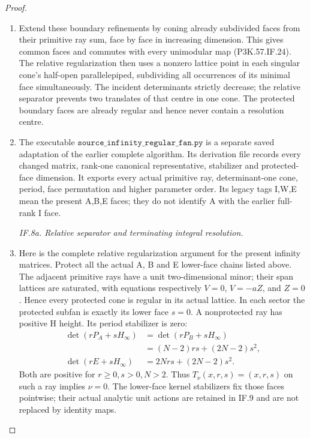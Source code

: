 \begin{proof}
\begin{enumerate}[label=\arabic*.]
\item Extend these boundary refinements by coning already subdivided
faces from their primitive ray sum, face by face in increasing
dimension. This gives common faces and commutes with every
unimodular map (P3K.57.IF.24). The relative regularization then uses a
nonzero lattice point in each singular cone's half-open
parallelepiped, subdividing all occurrences of its minimal face
simultaneously. The incident determinants strictly decrease;
the relative separator prevents two translates of that centre
in one cone. The protected boundary faces are already regular
and hence never contain a resolution centre.

\item The executable \(\texttt{source\_infinity\_regular\_fan.py}\) is a
separate saved adaptation of the earlier complete algorithm.
Its derivation file records every changed matrix, rank-one
canonical representative, stabilizer and protected-face dimension.
It exports every actual primitive ray, determinant-one cone,
period, face permutation and higher parameter order. Its legacy
tags I,W,E mean the present A,B,E faces; they do not identify A
with the earlier full-rank I face.

\par\smallskip\noindent\textit{IF.8a. Relative separator and terminating integral resolution.}\par\nopagebreak[4]

\item Here is the complete relative regularization argument for the
present infinity matrices. Protect all the actual A, B and E
lower-face chains listed above. The adjacent primitive rays
have a unit two-dimensional minor; their span lattices are
saturated, with equations respectively \(V=0\),
\(V=-aZ\), and \(Z=0\). Hence every protected cone is
regular in its actual lattice. In each sector the protected
subfan is exactly its lower face \(s=0\). A nonprotected
ray has positive H height. Its period stabilizer is zero:
\[
 \begin{aligned}
 \det(rP_A+sH_\infty)&=\det(rP_B+sH_\infty)\\
                    &=(N-2)rs+(2N-2)s^2,\\
 \det(rE+sH_\infty)&=2Nrs+(2N-2)s^2.
 \end{aligned}                                         \tag{P3K.57.IF.26a}
\]
Both are positive for \(r\ge0,s>0,N>2\). Thus
\(T_\nu(x,r,s)=(x,r,s)\) on such a ray implies
\(\nu=0\). The lower-face kernel stabilizers fix those
faces pointwise; their actual analytic unit actions are
retained in IF.9 and are not replaced by identity maps.


\end{enumerate}
\end{proof}
